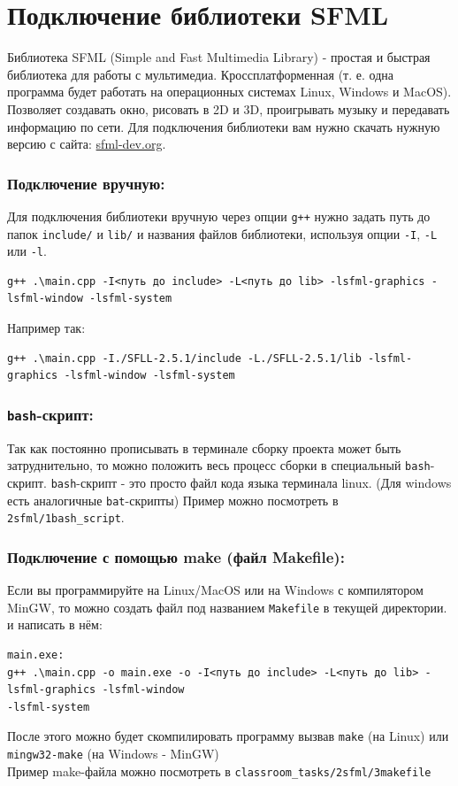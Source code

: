 \documentclass{article}
\begin{document}
\newpage

\section*{Подключение библиотеки SFML}
Библиотека SFML (Simple and Fast Multimedia Library) - простая и быстрая библиотека для работы с мультимедиа. Кроссплатформенная (т. е. одна программа будет работать на операционных системах Linux, Windows и MacOS). Позволяет создавать окно, рисовать в 2D и 3D, проигрывать музыку и передавать информацию по сети. Для подключения библиотеки вам нужно скачать нужную версию с сайта: \href{https://www.sfml-dev.org/}{sfml-dev.org}.

\subsubsection*{Подключение вручную:}
Для подключения библиотеки вручную через опции \texttt{g++} нужно задать путь до папок \texttt{include/} и \texttt{lib/} и названия файлов библиотеки, используя опции \texttt{-I}, \texttt{-L} или \texttt{-l}. 
\begin{verbatim}
g++ .\main.cpp -I<путь до include> -L<путь до lib> -lsfml-graphics -lsfml-window -lsfml-system
\end{verbatim}
Например так:
\begin{verbatim}
g++ .\main.cpp -I./SFLL-2.5.1/include -L./SFLL-2.5.1/lib -lsfml-graphics -lsfml-window -lsfml-system
\end{verbatim}

\subsubsection*{\texttt{bash}-скрипт:} Так как постоянно прописывать в терминале сборку проекта может быть затруднительно, то можно положить весь процесс сборки в специальный \texttt{bash}-скрипт. \texttt{bash}-скрипт - это просто файл кода языка терминала linux. (Для windows есть аналогичные \texttt{bat}-скрипты) Пример можно посмотреть в \texttt{2sfml/1bash\_script}.


\subsubsection*{Подключение с помощью make (файл Makefile):}
Если вы программируйте на Linux/MacOS или на Windows с компилятором MinGW, то можно создать файл под названием \texttt{Makefile} в текущей директории. и написать в нём:
\begin{verbatim}
main.exe:
g++ .\main.cpp -o main.exe -o -I<путь до include> -L<путь до lib> -lsfml-graphics -lsfml-window 
-lsfml-system
\end{verbatim}
После этого можно будет скомпилировать программу вызвав \texttt{make} (на Linux) или \texttt{mingw32-make} (на Windows - MinGW)\\
Пример make-файла можно посмотреть в \texttt{classroom\_tasks/2sfml/3makefile}
\end{document}

